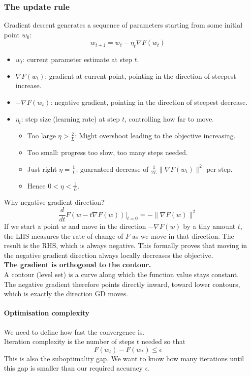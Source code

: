 \documentclass[../Probability.tex]{subfiles}
\begin{document}
\subsubsection{The update rule}
Gradient descent generates a sequence of parameters starting from some initial point $w_0$:
$$w_{t+1} = w_t - \eta_t \nabla F(w_t)$$
\begin{itemize}
    \item $w_t$: current parameter estimate at step $t$.
    \item $\nabla F(w_t)$: gradient at current point, pointing in the direction of steepest increase.
    \item $-\nabla F(w_t)$: negative gradient, pointing in the direction of steepest decrease.
    \item $\eta_t$: step size (learning rate) at step $t$, controlling how far to move.
    \begin{itemize}
        \item Too large $\eta > \frac{2}{L}$: Might overshoot leading to the objective increasing.
        \item Too small: progress too slow, too many steps needed.
        \item Just right $\eta = \frac{1}{L}$: guaranteed decrease of $\frac{1}{2L}\|\nabla F(w_t)\|^2$ per step.
        \item Hence $0 < \eta < \frac{1}{L}$.
    \end{itemize}
\end{itemize}
Why negative gradient direction?
$$\frac{d}{dt}F(w - t\nabla F(w))\bigg|_{t=0} = -\|\nabla F(w)\|^2$$
If we start a point $w$ and move in the direction $-\nabla F(w)$ by a tiny amount $t$, the LHS measures the rate of change of $F$ as we move in that direction.
The result is the RHS, which is always negative. This formally proves that moving in the negative gradient direction always locally decreases the objective.\\
\textbf{The gradient is orthogonal to the contour.}\\
A contour (level set) is a curve along which the function value stays constant. The negative gradient therefore points directly inward, toward lower contours, which is exactly the direction GD moves.
\paragraph{Optimisation complexity} We need to define how fast the convergence is.\\
Iteration complexity is the number of steps $t$ needed so that
$$F(w_t) - F(w_*) \leq \epsilon$$
This is also the suboptimality gap. We want to know how many iterations until this gap is smaller than our required accuracy $\epsilon$.
\end{document}
